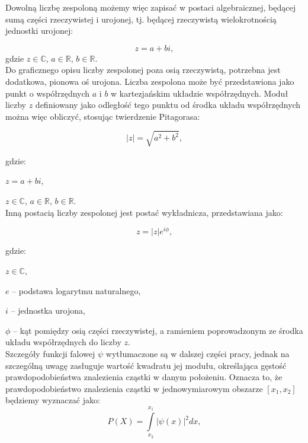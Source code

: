 \documentclass{SGGW-thesis}
\begin{document}
	Dowolną liczbę zespoloną możemy więc zapisać w postaci algebraicznej, będącej sumą części rzeczywistej i urojonej, tj. będącej rzeczywistą wielokrotnością jednostki urojonej:
	
	\begin{equation}
	z = a+bi,
	\end{equation}
	gdzie
	$z \in \mathbb{C}$,
	$a \in \mathbb{R}$,
	$b \in \mathbb{R}$.\\
	
	Do graficznego opisu liczby zespolonej poza osią rzeczywistą, potrzebna jest dodatkowa, pionowa oś urojona. Liczba zespolona może być przedstawiona jako punkt o współrzędnych $a$ i $b$ w kartezjańskim układzie współrzędnych. Moduł liczby $z$ definiowany jako odległość tego punktu od środka układu współrzędnych można więc obliczyć, stosując twierdzenie Pitagorasa:
	
	\begin{equation}
	|z| = \sqrt{a^2+b^2},
	\end{equation}
	
	gdzie:
	
	$ z = a + bi$,
	
	$z \in \mathbb{C}$,
	$a \in \mathbb{R}$,
	$b \in \mathbb{R}$.\\
	
	Inną postacią liczby zespolonej jest postać wykładnicza, przedstawiana jako:
	
	\begin{equation}
	z = |z|e^{i\phi},
	\end{equation}
	
	gdzie:
	
	$z \in \mathbb{C}$,
	
	$e$ -- podstawa logarytmu naturalnego,
	
	$i$ -- jednostka urojona,
	
	$\phi$ -- kąt pomiędzy osią części rzeczywistej, a ramieniem poprowadzonym ze środka układu współrzędnych do liczby $z$.\\
	
	Szczegóły funkcji falowej $\psi$ wytłumaczone są w dalszej części pracy, jednak na szczególną uwagę zasługuje wartość kwadratu jej modułu, określająca gęstość prawdopodobieństwa znalezienia cząstki w danym położeniu. Oznacza to, że prawdopodobieństwo znalezienia cząstki w jednowymiarowym obszarze $[x_1, x_2]$ będziemy wyznaczać jako:
	\begin{equation}
	P(X) = \int\limits_{x_2}^{x_1} |\psi(x)|^2dx,
	\end{equation}
	
\end{document}
